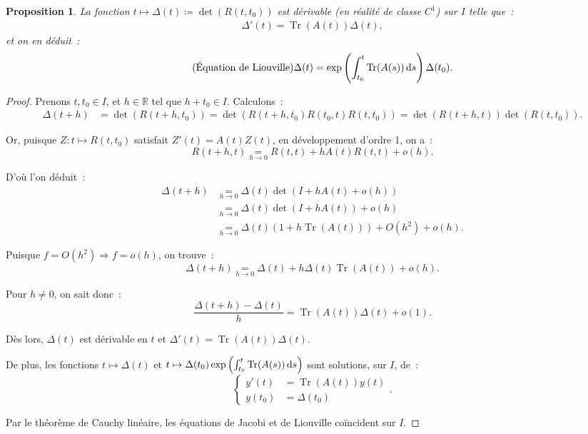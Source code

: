 \documentclass{report}
\newtheorem{prp}[thm]{Proposition}
\theoremstyle{definition}
\theoremstyle{remark}
\numberwithin{equation}{section}
\newcommand{\R}{\mathbb R}
\DeclareMathOperator{\Tr}{Tr}
\begin{document}
		\begin{prp} La fonction $t \mapsto \Delta(t) \coloneqq \det(R(t, t_0))$ est dérivable (en réalité de classe $C^1$) sur $I$ telle que~:
		\begin{align}\tag{Équation de Jacobi}
			\Delta'(t) = \Tr(A(t))\Delta(t),
		\end{align}
		et on en déduit~:
		\begin{align}\tag{Équation de Liouville}
			\Delta(t) = \exp\left(\int_{t_0}^t\Tr(A(s))\dif s\right)\Delta(t_0).
		\end{align}
		\end{prp}

		\begin{proof} Prenons $t, t_0 \in I$, et $h \in \R$ tel que $h + t_0 \in I$. Calculons~:
		\begin{align}
			\Delta(t+h) &= \det(R(t+h, t_0)) = \det(R(t+h, t_0)R(t_0, t)R(t, t_0)) = \det(R(t+h, t))\det(R(t, t_0)).
		\end{align}

		Or, puisque $Z : t \mapsto R(t, t_0)$ satisfait $Z'(t) = A(t)Z(t)$, en développement d'ordre 1, on a~:
		\begin{equation}
			R(t+h, t) \underset{h \to 0}= R(t, t) + hA(t)R(t, t) + o(h).
		\end{equation}

		D'où l'on déduit~:
		\begin{align}
			\Delta(t+h) &\underset{h \to 0}= \Delta(t)\det(I + hA(t) + o(h)) \\
			&\underset{h \to 0}= \Delta(t)\det(I + hA(t)) + o(h) \\
			&\underset{h \to 0}= \Delta(t)\left(1 + h\Tr(A(t))\right) + O(h^2) + o(h).
		\end{align}

		Puisque $f = O(h^2) \Rightarrow f = o(h)$, on trouve~:
		\begin{equation}
			\Delta(t+h) \underset{h \to 0}= \Delta(t) + h\Delta(t)\Tr(A(t)) + o(h).
		\end{equation}

		Pour $h \neq 0$, on sait donc~:
		\begin{equation}
			\frac {\Delta(t+h)-\Delta(t)}h = \Tr(A(t))\Delta(t) + o(1).
		\end{equation}

		Dès lors, $\Delta(t)$ est dérivable en $t$ et $\Delta'(t) = \Tr(A(t))\Delta(t)$.

		De plus, les fonctions $t \mapsto \Delta(t)$ et $t \mapsto \Delta(t_0)\exp\left(\int_{t_0}^t\Tr(A(s))\dif s\right)$ sont solutions, sur $I$, de~:
		\begin{equation}
			\begin{cases}y'(t) &= \Tr(A(t))y(t) \\y(t_0) &= \Delta(t_0)\end{cases}.
		\end{equation}

		Par le théorème de Cauchy linéaire, les équations de Jacobi et de Liouville coïncident sur $I$.
		\end{proof}
\end{document}
